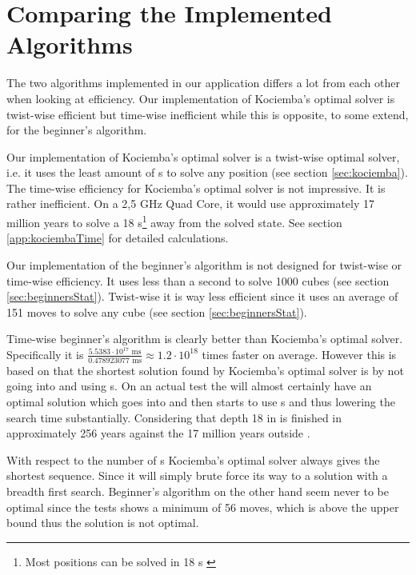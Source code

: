 \section{Comparing the Implemented Algorithms}
The two algorithms implemented in our application differs a lot from each other when looking at efficiency. 
Our implementation of Kociemba's optimal solver is twist-wise efficient but time-wise inefficient while this is opposite, to some extend, for the beginner's algorithm. 

Our implementation of Kociemba's optimal solver is a twist-wise optimal solver, i.e. it uses the least amount of \twist{}s to solve any position (see section \ref{sec:kociemba}).
The time-wise efficiency for Kociemba's optimal solver is not impressive.
It is rather inefficient.
On a 2,5 GHz Quad Core, it would use approximately 17 million years to solve a \cube{} 18 \twist{}s\footnote{Most positions can be solved in 18 \twist{}s \cite{kociemba09}} away from the solved state.
See section \ref{app:kociembaTime} for detailed calculations.   

Our implementation of the beginner's algorithm is not designed for twist-wise or time-wise efficiency. It uses less than a second to solve 1000 cubes (see section \ref{sec:beginnersStat}). 
Twist-wise it is way less efficient since it uses an average of 151 moves to solve any cube (see section \ref{sec:beginnersStat}).

Time-wise beginner's algorithm is clearly better than Kociemba's optimal solver.
Specifically it is $\frac{5.5383 \cdot 10^{17} \text{ ms}}{0.478923077 \text{ ms}} \approx 1.2 \cdot 10^{18}$ times faster on average.
However this is based on that the shortest solution found by Kociemba's optimal solver is by not going into  and using  \twist{}s.
On an actual test the \rubik{} will almost certainly have an optimal solution which goes into  and then starts to use  \twist{}s and thus lowering the search time substantially.
Considering that depth 18 in  is finished in approximately 256 years against the 17 million years outside .

With respect to the number of \twist{}s Kociemba's optimal solver always gives the shortest \twist{} sequence.
Since it will simply brute force its way to a solution with a breadth first search.%
Beginner's algorithm on the other hand seem never to be optimal since the tests shows a minimum of 56 moves, which is above the upper bound thus the solution is not optimal.

